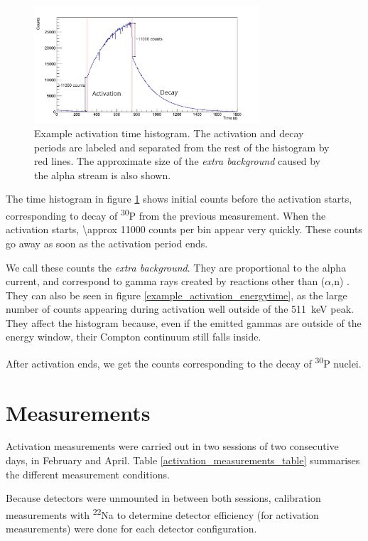 \documentclass[a4paper,12pt]{report}
\newcommand{\an}{($\alpha$,n) }
\newcommand{\Piso}{\textsuperscript{30}P }
\newcommand{\Na}{\textsuperscript{22}Na }
\begin{document}
\begin{figure}[H]
	\centering
	\includegraphics[width=0.75\textwidth]{example_activation_time_histogram.png}
	\caption{Example activation time histogram.
	The activation and decay periods are labeled and separated from the rest of the histogram by red lines.
	The approximate size of the \textit{extra background} caused by the alpha stream is also shown.}
	\label{example_activation_time_histogram}
\end{figure}

The time histogram in figure \ref{example_activation_time_histogram} shows initial counts before the activation starts, corresponding to decay of \Piso from the previous measurement.
When the activation starts, \num{\approx 11000} counts per bin appear very quickly.
These counts go away as soon as the activation period ends.

We call these counts the \textit{extra background}.
They are proportional to the alpha current, and correspond to gamma rays created by reactions other than \an.
They can also be seen in figure \ref{example_activation_energytime}, as the large number of counts appearing during activation well outside of the \qty{511}{\keV} peak.
They affect the histogram because, even if the emitted gammas are outside of the energy window, their Compton continuum still falls inside.

After activation ends, we get the counts corresponding to the decay of \Piso nuclei.

\section{Measurements}
Activation measurements were carried out in two sessions of two consecutive days, in February and April.
Table \ref{activation_measurements_table} summarises the different measurement conditions.

Because detectors were unmounted in between both sessions, calibration measurements with \Na to determine detector efficiency (for activation measurements) were done for each detector configuration.
\end{document}
